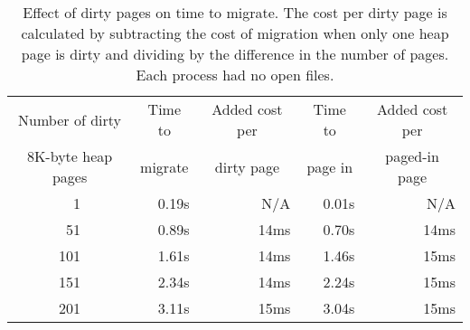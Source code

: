  \begin{table}[h]
 \begin{center}
 \begin{tabular} {|c||l r|l r||l r|l r|}
	 \hline
	 \hline
    Number of dirty  &\multicolumn{2}{c|}{Time to} &
    \multicolumn{2}{c||}{Added cost per} &
    \multicolumn{2}{c|}{Time to} &
    \multicolumn{2}{c|}{Added cost per} \\
    8K-byte heap pages&\multicolumn{2}{c|}{migrate} &
    \multicolumn{2}{c||}{dirty page} &
    \multicolumn{2}{c|}{page in} &
    \multicolumn{2}{c|}{paged-in page} \\
	 \hline
   ~~1 	&&	0.19s	&&	N/A&	& 0.01s     &&  N/A\\
 \hline
  ~51 	&&	0.89s	&&	14ms&	&  0.70s && 14ms \\
 \hline
  101 	&&	1.61s	&&	14ms&	&  1.46s && 15ms\\
 \hline
  151 	&&	2.34s	&&	14ms&	&  2.24s && 15ms\\
 \hline
  201 	&&	3.11s	&&	15ms&	&  3.04s && 15ms\\
	 \hline
	 \hline
 \end{tabular}
 \caption{Effect of dirty  pages on time to migrate.  The cost per
 dirty page is calculated by subtracting the cost of migration when
 only one heap  page is dirty
  and dividing by the difference in the
 number of pages. Each process had no open files.
}
 \label{paging}
 \end{center}
 \end{table}


